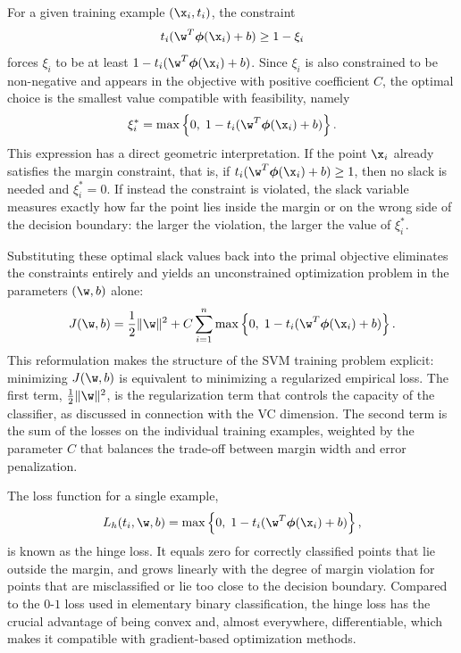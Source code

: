 For a given training example $(\x_i, t_i)$, the constraint
\begin{equation}
t_i(\w^T\boldsymbol{\phi}(\x_i)+b) \geq 1-\xi_i
\end{equation}
forces $\xi_i$ to be at least $1 - t_i(\w^T\boldsymbol{\phi}(\x_i)+b)$. Since $\xi_i$ is
also constrained to be non-negative and appears in the objective with positive coefficient
$C$, the optimal choice is the smallest value compatible with feasibility, namely
\begin{equation}
\xi_i^* = \max\left\{0,\; 1 - t_i(\w^T\boldsymbol{\phi}(\x_i)+b)\right\}.
\end{equation}
This expression has a direct geometric interpretation. If the point $\x_i$ already satisfies
the margin constraint, that is, if $t_i(\w^T\boldsymbol{\phi}(\x_i)+b) \geq 1$, then no
slack is needed and $\xi_i^* = 0$. If instead the constraint is violated, the slack variable
measures exactly how far the point lies inside the margin or on the wrong side of the
decision boundary: the larger the violation, the larger the value of $\xi_i^*$.

Substituting these optimal slack values back into the primal objective eliminates the
constraints entirely and yields an unconstrained optimization problem in the parameters
$(\w,b)$ alone:
\begin{equation}
J(\w,b) = \frac{1}{2}\|\w\|^2 + C\sum_{i=1}^{n}\max\left\{0,\; 1 -
t_i(\w^T\boldsymbol{\phi}(\x_i)+b)\right\}.
\end{equation}
This reformulation makes the structure of the SVM training problem explicit: minimizing
$J(\w,b)$ is equivalent to minimizing a regularized empirical loss. The first term,
$\frac{1}{2}\|\w\|^2$, is the regularization term that controls the capacity of the
classifier, as discussed in connection with the VC dimension. The second term is the sum of
the losses on the individual training examples, weighted by the parameter $C$ that balances
the trade-off between margin width and error penalization.

The loss function for a single example,
\begin{equation}
L_{h}(t_i, \w, b) = \max\left\{0,\; 1 - t_i(\w^T\boldsymbol{\phi}(\x_i)+b)\right\},
\end{equation}
is known as the \alert{hinge loss}. It equals zero for correctly classified points that lie
outside the margin, and grows linearly with the degree of margin violation for points that
are misclassified or lie too close to the decision boundary. Compared to the $0$-$1$ loss
used in elementary binary classification, the hinge loss has the crucial advantage of being
convex and, almost everywhere, differentiable, which makes it compatible with
gradient-based optimization methods.

